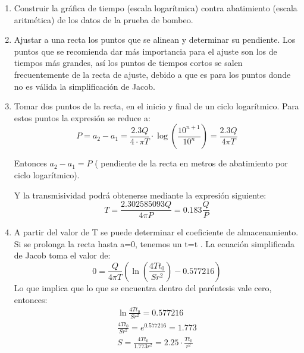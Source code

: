 \begin{enumerate}
    \item Construir la gráfica de tiempo (escala logarítmica) contra abatimiento (escala aritmética) de los datos de la prueba de bombeo.
    \item Ajustar a una recta los puntos que se alinean y determinar su pendiente. Los puntos que se recomienda dar más importancia para el ajuste son los de tiempos más grandes, así los puntos de tiempos cortos se salen frecuentemente de la recta de ajuste, debido a que es para los puntos donde no es válida la simplificación de Jacob.
    \item Tomar dos puntos de la recta, en el inicio y final de un ciclo logarítmico. Para estos puntos la expresión se reduce a:
    \begin{equation}
        P = a_2 - a_1 = \frac{2.3Q}{4 \cdot \pi T} \cdot \log{\left(\frac{10^{n + 1 }}{10^n}\right)} = \frac{2.3Q}{4 \pi T}
    \end{equation}
    
    Entonces $a_2- a_1 = P$ ( pendiente de la recta en metros de abatimiento por ciclo logarítmico).
    
    Y la transmisividad podrá obtenerse mediante la expresión siguiente:
    \begin{equation}
        T = \frac{2.302585093Q}{4\pi P} = 0.183 \frac{Q}{P}
    \end{equation}
    \item A partir del valor de T se puede determinar el coeficiente de almacenamiento. Si se prolonga la recta hasta a=0, tenemos un t=t . La ecuación simplificada de Jacob toma el valor de:
    \begin{equation}
        0 = \frac{Q}{4\pi T} \left(\ln{\left(\frac{4Tt_0}{Sr^2}\right)} -0.577216 \right)
    \end{equation}
    Lo que implica que lo que se encuentra dentro del paréntesis vale cero, entonces:
    \begin{align*}
        \ln{\frac{4Tt_0}{Sr^2}} = 0.577216\\
        \frac{4Tt_0}{Sr^2} = e^{0.577216} =1.773\\
        S = \frac{4Tt_0}{1.773r^2} = 2.25 \cdot \frac{Tt_0}{r^2}
    \end{align*}
\end{enumerate}

